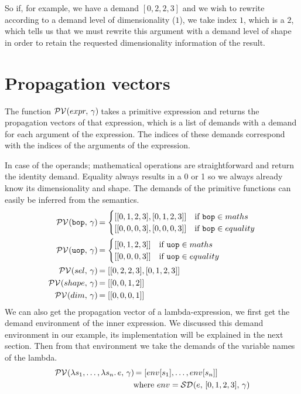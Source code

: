 \documentclass[../main.tex]{subfiles}
\begin{document}
So if, for example, we have a demand $[0,2,2,3]$ and we wish to rewrite according to a demand level of dimensionality ($1$), we take index $1$, which is a $2$, which tells us that we must rewrite this argument with a demand level of shape in order to retain the requested dimensionality information of the result.

\section{Propagation vectors}\label{sec:pv}
The function $\mathcal{PV}\hspace{-1.2pt} \left( expr,\, \gamma \right) \hspace{-1pt}$ takes a primitive expression and returns the propagation vectors of that expression, which is a list of demands with a demand for each argument of the expression. The indices of these demands correspond with the indices of the arguments of the expression.

In case of the operands; mathematical operations are straightforward and return the identity demand. Equality always results in a 0 or 1 so we always already know its dimensionality and shape. The demands of the primitive functions can easily be inferred from the semantics.
\begin{align*}
    \mathcal{PV}\hspace{-1.2pt} \left( \texttt{bop},\, \gamma \right) \hspace{-1pt}
        &= \begin{cases}
            [[0,1,2,3], [0,1,2,3]] &\text{if } \texttt{bop} \in maths \\
            [[0,0,0,3], [0,0,0,3]] &\text{if } \texttt{bop} \in equality
        \end{cases} \\
    \mathcal{PV}\hspace{-1.2pt} \left( \texttt{uop},\, \gamma \right) \hspace{-1pt}
        &= \begin{cases}
            [[0,1,2,3]] &\text{if } \texttt{uop} \in maths \\
            [[0,0,0,3]] &\text{if } \texttt{uop} \in equality
        \end{cases} \\
    \mathcal{PV}\hspace{-1.2pt} \left( sel,\, \gamma \right) \hspace{-1pt}   &= [[0,2,2,3], [0,1,2,3]] \\
    \mathcal{PV}\hspace{-1.2pt} \left( shape,\, \gamma \right) \hspace{-1pt} &= [[0,0,1,2]] \\
    \mathcal{PV}\hspace{-1.2pt} \left( dim,\, \gamma \right) \hspace{-1pt}   &= [[0,0,0,1]]
\end{align*}
%
We can also get the propagation vector of a lambda-expression, we first get the demand environment of the inner expression. We discussed this demand environment in our example, its implementation will be explained in the next section. Then from that environment we take the demands of the variable names of the lambda.
\begin{align*}
    \mathcal{PV}\hspace{-1.2pt} \left( \lambda s_1,\dots,\lambda s_n.\, e,\, \gamma \right) \hspace{-1pt}
        &= [env[s_1], \dots, env[s_n]] \\
        &\text{where } env = \mathcal{SD}\hspace{-1.2pt} \left( e,\, [0,1,2,3],\, \gamma \right) \hspace{-1pt}
\end{align*}
\end{document}
